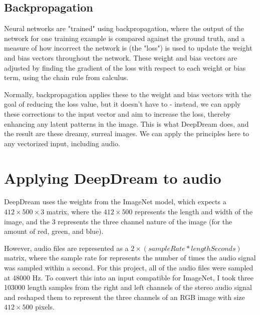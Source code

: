\documentclass[11pt]{article}
\begin{document}
\subsection{Backpropagation}

Neural networks are "trained" using backpropagation, where the output of the network for one training example is compared against
the ground truth, and a measure of how incorrect the network is (the "loss") is used to update the weight and bias vectors throughout the network.
These weight and bias vectors are adjusted by finding the gradient of the loss with respect to each weight or bias term, using the chain rule from calculus.

Normally, backpropagation applies these to the weight and bias vectors with the goal of reducing the loss value, but it doesn't have to - instead, we can apply these
corrections to the input vector and aim to increase the loss, thereby enhancing any latent patterns in the image. This is what DeepDream does, and the result are these dreamy, surreal images.
We can apply the principles here to any vectorized input, including audio.

\section{Applying DeepDream to audio}
DeepDream uses the weights from the ImageNet model, which expects a $412 \times 500 \times 3$ matrix, where the $412 \times 500$ represents the length and width
of the image, and the 3 represents the three channel nature of the image (for the amount of red, green, and blue).

However, audio files are represented as a $2 \times (sampleRate * lengthSeconds)$ matrix, where the sample rate for represents the number of times the audio signal was sampled
within a second. For this project, all of the audio files were sampled at 48000 Hz. To convert this into an input compatible for ImageNet, I took three 103000 length samples from
the right and left channels of the stereo audio signal and reshaped them to represent the three channels of an RGB image with size $412 \times 500$ pixels.
\end{document}
